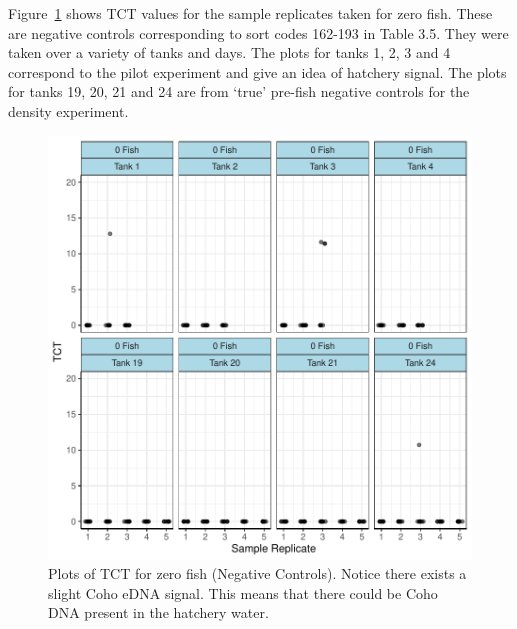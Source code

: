 \vspace{5mm}


Figure~\ref{lab:introplots1232} shows TCT values for the sample replicates taken for zero fish.  These are negative controls corresponding to sort codes 162-193 in Table 3.5. They were taken over a variety of tanks and days. The plots for tanks 1, 2, 3 and 4 correspond to the pilot experiment and give an idea of hatchery signal. The plots for tanks 19, 20, 21 and 24  are from `true' pre-fish negative controls for the density experiment.



\begin{figure}[H]
\includegraphics{Chapter3Images/gz2.pdf}
\begin{center}
\caption{ Plots of TCT for zero fish (Negative Controls). Notice there exists a slight Coho eDNA signal. This means that there could be Coho DNA present in the hatchery water. }
\label{lab:introplots1232}
\end{center}
\end{figure}




